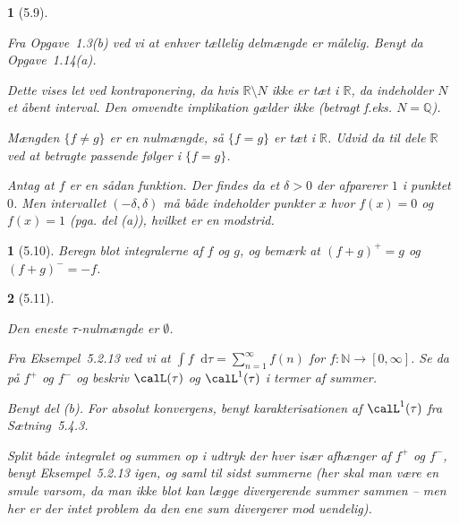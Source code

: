 \documentclass[a4paper, 11pt, article, danish, oneside]{memoir}
\title{\doctitle}
\author{\docauthor}
\newcommand{\naturals}{\mathbb{N}}
\newcommand{\rationals}{\mathbb{Q}}
\newcommand{\reals}{\mathbb{R}}
\newcommand{\dif}{\mathop{}\!\mathrm{d}}
\newcommand{\pencilsymbol}{\raisebox{-2pt}{\normalfont\PencilLeft}}
\theoremstyle{changedotcustomnumber}
\newtheorem{opgave}{\pencilsymbol}
\theoremstyle{changedotbreakcustomnumber}
\newtheorem{opgavebreak}{\pencilsymbol}
\begin{document}
\maketitle


\begin{opgavebreak}[5.9]
\begin{solutionsec}
    \item Fra Opgave~1.3(b) ved vi at enhver tællelig delmængde er målelig. Benyt da Opgave~1.14(a).

    \item Dette vises let ved kontraponering, da hvis $\reals \setminus N$ ikke er tæt i $\reals$, da indeholder $N$ et åbent interval. Den omvendte implikation gælder ikke (betragt f.eks. $N = \rationals$).

    \item Mængden $\{f \neq g\}$ er en nulmængde, så $\{f = g\}$ er tæt i $\reals$. Udvid da til dele $\reals$ ved at betragte passende følger i $\{f = g\}$.

    \item Antag at $f$ er en sådan funktion. Der findes da et $\delta > 0$ der afparerer $1$ i punktet $0$. Men intervallet $(-\delta,\delta)$ må både indeholder punkter $x$ hvor $f(x) = 0$ og $f(x) = 1$ (pga. del (a)), hvilket er en modstrid.
\end{solutionsec}
\end{opgavebreak}


\begin{opgave}[5.10]
    Beregn blot integralerne af $f$ og $g$, og bemærk at $(f + g)^+ = g$ og $(f + g)^- = -f$.
\end{opgave}


\begin{opgavebreak}[5.11]
\begin{solutionsec}
    \item Den eneste $\tau$-nulmængde er $\emptyset$.

    \item Fra Eksempel~5.2.13 ved vi at $\int f \dif\tau = \sum_{n=1}^\infty f(n)$ for $f \colon \naturals \to [0,\infty]$. Se da på $f^+$ og $f^-$ og beskriv $\calL(\tau)$ og $\calL^1(\tau)$ i termer af summer.

    \item Benyt del (b). For absolut konvergens, benyt karakterisationen af $\calL^1(\tau)$ fra Sætning~5.4.3.

    \item Split både integralet og summen op i udtryk der hver især afhænger af $f^+$ og $f^-$, benyt Eksempel~5.2.13 igen, og saml til sidst summerne (her skal man være en smule varsom, da man ikke blot kan lægge divergerende summer sammen -- men her er der intet problem da den ene sum divergerer mod \emph{uendelig}).
\end{solutionsec}
\end{opgavebreak}
\end{document}
